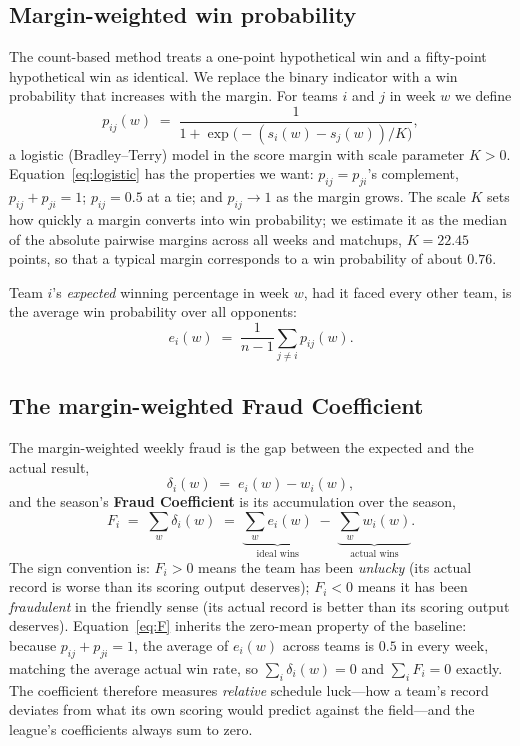 \documentclass[11pt]{article}
\begin{document}
\subsection{Margin-weighted win probability}
\label{sec:margin}

The count-based method treats a one-point hypothetical win and a
fifty-point hypothetical win as identical. We replace the binary indicator
with a win probability that increases with the margin. For teams $i$ and $j$
in week $w$ we define
\begin{equation}
p_{ij}(w) \;=\; \frac{1}{1+\exp\!\bigl(-(s_i(w)-s_j(w))/K\bigr)},
\label{eq:logistic}
\end{equation}
a logistic (Bradley--Terry) model in the score margin with scale parameter
$K>0$. Equation~\eqref{eq:logistic} has the properties we want:
$p_{ij}=p_{ji}$'s complement, $p_{ij}+p_{ji}=1$; $p_{ij}=0.5$ at a tie; and
$p_{ij}\to 1$ as the margin grows. The scale $K$ sets how quickly a margin
converts into win probability; we estimate it as the median of the absolute
pairwise margins across all weeks and matchups, $K=22.45$ points, so that a
typical margin corresponds to a win probability of about $0.76$.

Team $i$'s \emph{expected} winning percentage in week $w$, had it faced every
other team, is the average win probability over all opponents:
\begin{equation}
e_i(w) \;=\; \frac{1}{n-1}\sum_{j\neq i} p_{ij}(w).
\label{eq:ideal}
\end{equation}

\subsection{The margin-weighted Fraud Coefficient}
\label{sec:definition}

The margin-weighted weekly fraud is the gap between the expected and the
actual result,
\begin{equation}
\delta_i(w) \;=\; e_i(w) - w_i(w),
\end{equation}
and the season's \textbf{Fraud Coefficient} is its accumulation over the
season,
\begin{equation}
F_i \;=\; \sum_{w} \delta_i(w)
\;=\; \underbrace{\sum_w e_i(w)}_{\text{ideal wins}}
\;-\; \underbrace{\sum_w w_i(w)}_{\text{actual wins}}.
\label{eq:F}
\end{equation}
The sign convention is: $F_i>0$ means the team has been \emph{unlucky}
(its actual record is worse than its scoring output deserves); $F_i<0$ means
it has been \emph{fraudulent} in the friendly sense (its actual record is
better than its scoring output deserves). Equation~\eqref{eq:F} inherits the
zero-mean property of the baseline: because $p_{ij}+p_{ji}=1$, the average of
$e_i(w)$ across teams is $0.5$ in every week, matching the average actual win
rate, so $\sum_i \delta_i(w)=0$ and $\sum_i F_i=0$ exactly. The coefficient
therefore measures \emph{relative} schedule luck---how a team's record
deviates from what its own scoring would predict against the field---and the
league's coefficients always sum to zero.
\end{document}

